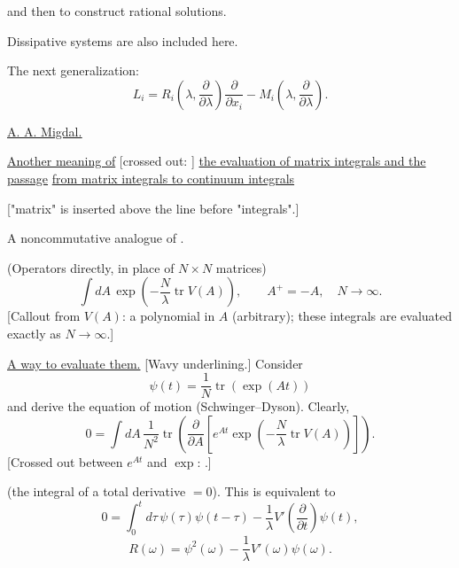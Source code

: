 and then 
to construct rational solutions.

Dissipative systems are also included here.

The next generalization:
\begin{equation*}
L_i=R_i\left(\lambda,\frac{\partial}{\partial\lambda}\right)
\frac{\partial}{\partial x_i}
-M_i\left(\lambda,\frac{\partial}{\partial\lambda}\right). \tag{34}
\end{equation*}

\underline{\underline{A. A. Migdal.}}

\underline{Another meaning of}
[crossed out: ]
\underline{the evaluation of matrix integrals and the passage}
\newline
\underline{from matrix integrals to continuum integrals}

["matrix" is inserted above the line before "integrals".]

A noncommutative analogue of
.

(Operators directly, in place of $N\times N$ matrices)
\begin{equation*}
\int dA\,\exp\left(-\frac N\lambda\operatorname{tr}V(A)\right),
\qquad A^+=-A,\quad N\to\infty. \tag{1}
\end{equation*}
[Callout from $V(A)$: a polynomial in $A$ (arbitrary); these integrals are evaluated exactly as $N\to\infty$.]

\underline{A way to evaluate them.} [Wavy underlining.] Consider
\begin{equation*}
\psi(t)=\frac1N\operatorname{tr}(\exp(At)) \tag{2}
\end{equation*}
and derive the equation of motion (Schwinger--Dyson). Clearly,
\begin{equation*}
0=\int dA\,\frac1{N^2}\operatorname{tr}\left(
\frac{\partial}{\partial A}\left[e^{At}
\exp\left(-\frac N\lambda\operatorname{tr}V(A)\right)\right]\right). \tag{3}
\end{equation*}
[Crossed out between $e^{At}$ and $\exp$:
.]

(the integral of a total derivative $=0$). This is equivalent to
\begin{equation*}
0=\int_0^t d\tau\,\psi(\tau)\psi(t-\tau)
-\frac1\lambda V'\left(\frac{\partial}{\partial t}\right)\psi(t), \tag{4}
\end{equation*}
\begin{equation*}
R(\omega)=\psi^2(\omega)-\frac1\lambda V'(\omega)\psi(\omega). \tag{5}
\end{equation*}

